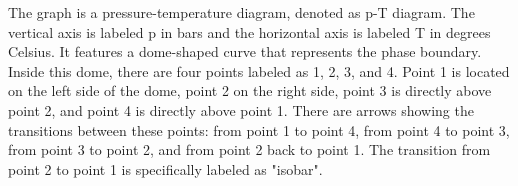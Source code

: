The graph is a pressure-temperature diagram, denoted as p-T diagram. The vertical axis is labeled p in bars and the horizontal axis is labeled T in degrees Celsius. It features a dome-shaped curve that represents the phase boundary. Inside this dome, there are four points labeled as 1, 2, 3, and 4. Point 1 is located on the left side of the dome, point 2 on the right side, point 3 is directly above point 2, and point 4 is directly above point 1. There are arrows showing the transitions between these points: from point 1 to point 4, from point 4 to point 3, from point 3 to point 2, and from point 2 back to point 1. The transition from point 2 to point 1 is specifically labeled as "isobar".